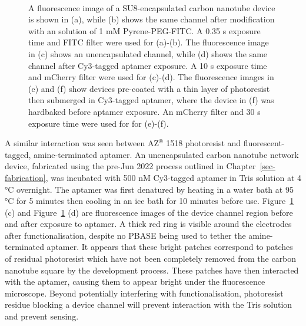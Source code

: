 \documentclass[
  a4paper,
]{scrbook}
\begin{document}
\begin{figure}
\begin{minipage}[t]{0.45\linewidth}
{{}

}

\end{minipage}%
%
\begin{minipage}[t]{0.01\linewidth}

{\centering 

~

}

\end{minipage}%

\caption[Fluorescence images demonstrating the interaction of
fluorescent-tagged linker or aptamer with photoresist present on a
carbon nanotube network device
surface.]{\label{fig-photoresist-contamination}A fluorescence image of a
SU8-encapsulated carbon nanotube device is shown in (a), while (b) shows
the same channel after modification with an solution of 1 mM
Pyrene-PEG-FITC. A 0.35 s exposure time and FITC filter were used for
(a)-(b). The fluorescence image in (c) shows an unencapsulated channel,
while (d) shows the same channel after Cy3-tagged aptamer exposure. A 10
s exposure time and mCherry filter were used for (c)-(d). The
fluorescence images in (e) and (f) show devices pre-coated with a thin
layer of photoresist then submerged in Cy3-tagged aptamer, where the
device in (f) was hardbaked before aptamer exposure. An mCherry filter
and 30 s exposure time were used for for (e)-(f).}

\end{figure}

A similar interaction was seen between AZ\(^\circledR\) 1518 photoresist
and fluorescent-tagged, amine-terminated aptamer. An unencapsulated
carbon nanotube network device, fabricated using the pre-Jun 2022
process outlined in Chapter~\ref{sec-fabrication}, was incubated with
500 nM Cy3-tagged aptamer in Tris solution at 4 °C overnight. The
aptamer was first denatured by heating in a water bath at 95 °C for 5
minutes then cooling in an ice bath for 10 minutes before use.
Figure~\ref{fig-photoresist-contamination} (c) and
Figure~\ref{fig-photoresist-contamination} (d) are fluorescence images
of the device channel region before and after exposure to aptamer. A
thick red ring is visible around the electrodes after functionalisation,
despite no PBASE being used to tether the amine-terminated aptamer. It
appears that these bright patches correspond to patches of residual
photoresist which have not been completely removed from the carbon
nanotube square by the development process. These patches have then
interacted with the aptamer, causing them to appear bright under the
fluorescence microscope. Beyond potentially interfering with
functionalisation, photoresist residue blocking a device channel will
prevent interaction with the Tris solution and prevent sensing.
\end{document}
